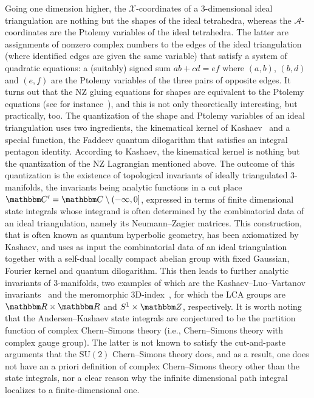 \documentclass[12pt,reqno]{amsart}
\theoremstyle{definition}
\def\BZ{\mathbbm Z}
\def\BR{\mathbbm R}
\def\BC{\mathbbm C}
\begin{document}
Going one dimension higher, the $\mathcal{X}$-coordinates of a 3-dimensional ideal
triangulation are nothing but the shapes of the ideal tetrahedra, whereas the
$\mathcal{A}$-coordinates are the Ptolemy variables of the ideal tetrahedra. The latter
are assignments of nonzero complex numbers to the edges of the ideal triangulation
(where identified edges are given the same variable) that satisfy a system of
quadratic equations: a (suitably) signed sum $ab+cd=ef$ where $(a,b)$, $(b,d)$
and $(e,f)$ are the Ptolemy variables of the three pairs of opposite edges. It turns
out that the NZ gluing equations for shapes are equivalent to the Ptolemy equations
(see for instance~\cite{Ga:ptolemy}), and this is not only theoretically interesting, but
practically, too. The quantization of the shape and Ptolemy variables of an ideal
triangulation uses two ingredients, the kinematical kernel of Kashaev~\cite{Kashaev:4D}
and a special
function, the Faddeev quantum dilogarithm that satisfies an integral pentagon identity.
According to Kashaev, the kinematical kernel is nothing but the quantization of the
NZ Lagrangian mentioned above. The outcome of this quantization is the existence of
topological invariants of ideally triangulated 3-manifolds, the invariants being
analytic functions in a cut place $\BC'=\BC\setminus (-\infty,0]$, expressed in terms
of finite dimensional state integrals whose integrand is often determined by
the combinatorial data of an ideal triangulation, namely its Neumann--Zagier matrices.
This construction, that is often known as quantum hyperbolic geometry, has been
axiomatized by Kashaev, and uses as input the combinatorial data of an ideal triangulation
together with a self-dual locally compact abelian group with fixed Gaussian, Fourier
kernel and quantum dilogarithm.   This then leads to further analytic invariants of
3-manifolds, two examples of which are the Kashaev--Luo--Vartanov invariants~\cite{KLV}
and the meromorphic 3D-index~\cite{GK:mero}, for which the LCA groups are $\BR \times \BR$
and $S^1 \times \BZ$, respectively. It is worth noting that the Andersen--Kashaev state
integrals are conjectured to be the partition function of complex Chern--Simons theory
(i.e., Chern--Simons theory with complex gauge group).
The latter is not known to satisfy the cut-and-paste arguments that the $\mathrm{SU}(2)$
Chern--Simons theory does, and as a result, one does not have an a priori definition
of complex Chern--Simons theory other than the state integrals, nor a clear reason
why the infinite dimensional path integral localizes to a finite-dimensional one. 
\end{document}
